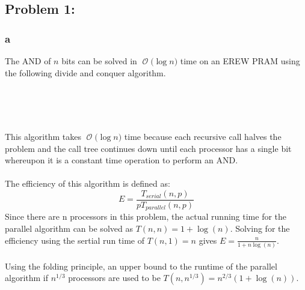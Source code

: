 \documentclass[12pt]{article}
\newcommand{\BigO}[1]{\ensuremath{\operatorname{\mathcal{O}}\bigl(#1\bigr)}}
\begin{document}
\subsection*{Problem 1: }
\subsubsection*{a}
The AND of $n$ bits can be solved in \BigO{\log n} time on an
EREW PRAM using the following divide and conquer algorithm.\\\\
\begin{algorithm}[H]
\\
\\
{}
\end{algorithm}
This algorithm takes \BigO{\log n} time because each recursive
call halves the problem and the call tree continues down until 
each processor has a single bit whereupon it is a constant
time operation to perform an AND.\\\\
The efficiency of this algorithm is defined as:
\[
E=\frac{T_{serial}(n,p)}{pT_{parallel}(n,p)}
\]
Since there are n processors in this problem, the actual running
time for the parallel algorithm can be solved as $T(n,n) = 1 + \log(n)$.
Solving for the efficiency using the sertial run time of $T(n,1) = n$
gives $E=\frac{n}{1+n\log(n)}$.\\\\
Using the folding principle, an upper bound to the runtime of the parallel
algorithm if $n^{1/3}$ processors are used to be $T(n,n^{1/3})=n^{2/3}(1+\log(n))$.
\end{document}

